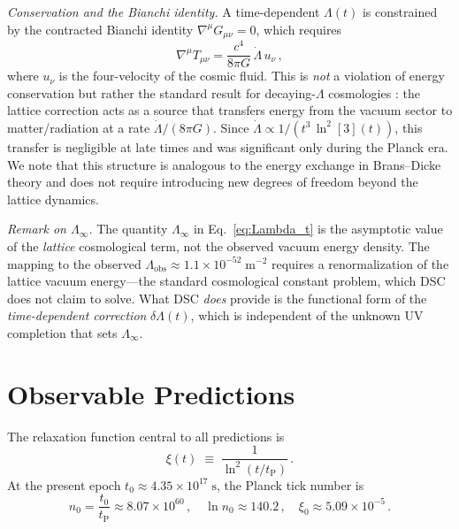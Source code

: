 \documentclass[twocolumn,showpacs,preprintnumbers,amsmath,amssymb,prd]{revtex4-2}
\newcommand{\lnq}{\ln^2}
\newcommand{\tP}{t_{\mathrm{P}}}
\begin{document}
\emph{Conservation and the Bianchi identity.}
A time-dependent $\Lambda(t)$ is constrained by the contracted
Bianchi identity $\nabla^\mu G_{\mu\nu} = 0$, which requires
\begin{equation}
  \nabla^\mu T_{\mu\nu}
  = \frac{c^4}{8\pi G}\,\dot\Lambda\,u_\nu\,,
  \label{eq:bianchi}
\end{equation}
where $u_\nu$ is the four-velocity of the cosmic fluid.
This is \emph{not} a violation of energy conservation but rather
the standard result for decaying-$\Lambda$ cosmologies
\cite{Ozer1986,Chen1990}: the lattice correction acts as a source
that transfers energy from the vacuum sector to matter/radiation
at a rate $\dot\Lambda/(8\pi G)$.
Since $\dot\Lambda \propto 1/(t^3\,\lnq[3](t))$, this transfer
is negligible at late times and was significant only during the
Planck era.
We note that this structure is analogous to the energy exchange
in Brans--Dicke theory and does not require introducing new
degrees of freedom beyond the lattice dynamics.

\emph{Remark on $\Lambda_\infty$.}
The quantity $\Lambda_\infty$ in Eq.~\eqref{eq:Lambda_t} is
the asymptotic value of the \emph{lattice} cosmological term,
not the observed vacuum energy density.
The mapping to the observed $\Lambda_{\mathrm{obs}} \approx
1.1 \times 10^{-52}\;\mathrm{m}^{-2}$ requires a renormalization
of the lattice vacuum energy---the standard cosmological constant
problem, which DSC does not claim to solve.
What DSC \emph{does} provide is the functional form of the
\emph{time-dependent correction} $\delta\Lambda(t)$, which is
independent of the unknown UV completion that sets $\Lambda_\infty$.

\section{Observable Predictions}\label{sec:predictions}

The relaxation function central to all predictions is
\begin{equation}
  \xi(t) \;\equiv\; \frac{1}{\lnq(t/\tP)}\,.
  \label{eq:xi}
\end{equation}
At the present epoch $t_0 \approx 4.35 \times 10^{17}\;\mathrm{s}$,
the Planck tick number is
\begin{equation}
  n_0 = \frac{t_0}{\tP} \approx 8.07 \times 10^{60}\,,
  \quad
  \ln n_0 \approx 140.2\,,
  \quad
  \xi_0 \approx 5.09 \times 10^{-5}\,.
  \label{eq:n0}
\end{equation}
\end{document}
